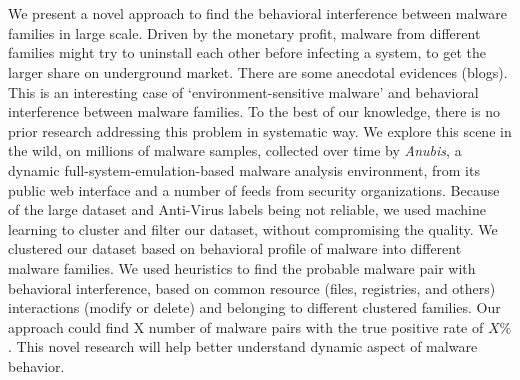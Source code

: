 \chapter{\abstractname}
We present a novel approach to find the behavioral interference between malware families in large scale.
Driven by the monetary profit, malware from different families might try to uninstall each other before infecting a system, to get the larger share on underground market.
There are some anecdotal evidences (blogs).
This is an interesting case of `environment-sensitive malware' and behavioral interference between malware families.
To the best of our knowledge, there is no prior research addressing this problem in systematic way.
We explore this scene in the wild, on millions of malware samples, collected over time by \emph{Anubis}, a dynamic full-system-emulation-based malware analysis environment, from its public web interface and a number of feeds from security organizations.
Because of the large dataset and Anti-Virus labels being not reliable, we used machine learning to cluster and filter our dataset, without compromising the quality.
We clustered our dataset based on behavioral profile of malware into different malware families.
We used heuristics to find the probable malware pair with behavioral interference, based on common resource (files, registries, and others) interactions (modify or delete) and belonging to different clustered families.
Our approach could find X number of malware pairs with the true positive rate of $X\%$.
This novel research will help better understand dynamic aspect of malware behavior.


